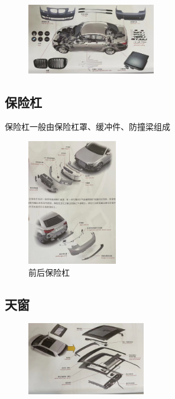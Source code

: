 \begin{figure}[htbp]
	\centering
	\includegraphics[width=0.5\textwidth]{4-8}
\end{figure}
\subsection{保险杠}
	保险杠一般由保险杠罩、缓冲件、防撞梁组成
	\begin{figure}[htbp]
		\centering
		\caption{前后保险杠}
		\includegraphics[width=0.35\textwidth]{4-9}
	\end{figure}

\subsection{天窗}
	\begin{figure}[htbp]
		\centering
		\includegraphics[width=0.46\textwidth]{4-10}
	\end{figure}

